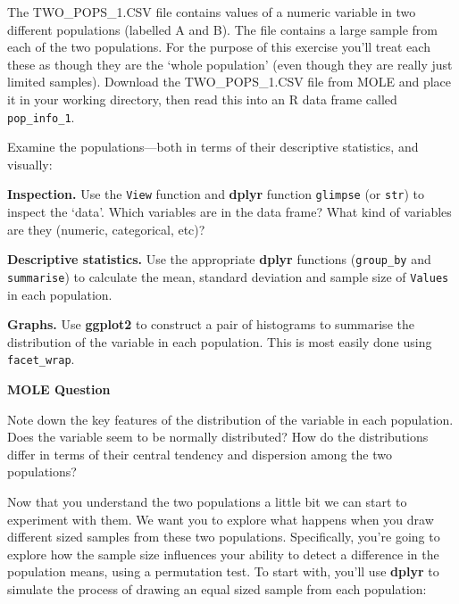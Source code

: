 \documentclass[]{book}
\newenvironment{Shaded}{\begin{snugshade}}{\end{snugshade}}
\newcommand{\KeywordTok}[1]{\textcolor[rgb]{0.13,0.29,0.53}{\textbf{{#1}}}}
\newcommand{\DecValTok}[1]{\textcolor[rgb]{0.00,0.00,0.81}{{#1}}}
\newcommand{\StringTok}[1]{\textcolor[rgb]{0.31,0.60,0.02}{{#1}}}
\newcommand{\CommentTok}[1]{\textcolor[rgb]{0.56,0.35,0.01}{\textit{{#1}}}}
\newcommand{\NormalTok}[1]{{#1}}
\begin{document}
The TWO\_POPS\_1.CSV file contains values of a numeric variable in two
different populations (labelled A and B). The file contains a large
sample from each of the two populations. For the purpose of this
exercise you'll treat each these as though they are the `whole
population' (even though they are really just limited samples). Download
the TWO\_POPS\_1.CSV file from MOLE and place it in your working
directory, then read this into an R data frame called
\texttt{pop\_info\_1}.

Examine the populations---both in terms of their descriptive statistics,
and visually:

\textbf{Inspection.} Use the \texttt{View} function and \textbf{dplyr}
function \texttt{glimpse} (or \texttt{str}) to inspect the `data'. Which
variables are in the data frame? What kind of variables are they
(numeric, categorical, etc)?

\textbf{Descriptive statistics.} Use the appropriate \textbf{dplyr}
functions (\texttt{group\_by} and \texttt{summarise}) to calculate the
mean, standard deviation and sample size of \texttt{Values} in each
population.

\textbf{Graphs.} Use \textbf{ggplot2} to construct a pair of histograms
to summarise the distribution of the variable in each population. This
is most easily done using \texttt{facet\_wrap}.

\begin{do-something}
\textbf{MOLE Question}

Note down the key features of the distribution of the variable in each
population. Does the variable seem to be normally distributed? How do
the distributions differ in terms of their central tendency and
dispersion among the two populations?
\end{do-something}

Now that you understand the two populations a little bit we can start to
experiment with them. We want you to explore what happens when you draw
different sized samples from these two populations. Specifically, you're
going to explore how the sample size influences your ability to detect a
difference in the population means, using a permutation test. To start
with, you'll use \textbf{dplyr} to simulate the process of drawing an
equal sized sample from each population:

\begin{Shaded}
\end{Shaded}
\end{document}

